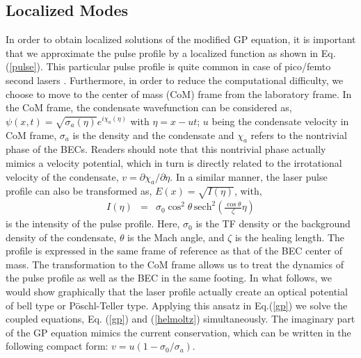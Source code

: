 \documentclass[epj]{svjour}
\begin{document}
\subsection{Localized Modes}

In order to obtain localized solutions of the modified GP equation, it is important that we approximate the pulse profile by a localized function as shown in Eq. (\ref{pulse}). This particular pulse profile is quite common in case of pico/femto second lasers \cite{joachain}. Furthermore, in order to reduce the computational difficulty, we choose to move to the center of mass (CoM) frame from the laboratory frame. In the CoM frame, the condensate wavefunction can be considered as, $\psi(x,t) = \sqrt{\sigma_{a}(\eta)} e^{i\chi_a(\eta)}$ with $\eta = x - u t$; $u$ being the condensate velocity in CoM frame, $\sigma_{a}$ is the density and the condensate and $\chi_{a}$ refers to the nontrivial phase of the BECs. Readers should note that this nontrivial phase actually mimics a velocity potential, which in turn is directly related to the irrotational velocity of the condensate, $v = \partial \chi_{a}/\partial \eta$. In a similar manner, the laser pulse profile can also be transformed as, $E(x) = \sqrt{I(\eta)}$, with,
\begin{eqnarray}
I(\eta) & = & \sigma_{0}\cos^{2}\theta\, \textrm{sech}^{2}\left(\frac{\cos\theta}{\zeta}\eta\right)\label{pulse}
\end{eqnarray}
is the intensity of the pulse profile. Here, $\sigma_0$ is the TF  density or the background density of the condensate, $\theta$ is the Mach angle, and $\zeta$ is the healing length. The profile is expressed in the same frame of reference as that of the BEC center of mass. The transformation to the CoM frame allows us to treat the dynamics of the pulse profile as well as the BEC in the same footing. In what follows, we would show graphically that the laser profile actually create an optical potential of bell type or P\"{o}schl-Teller type. Applying this ansatz in Eq.(\ref{gp}) we solve the coupled equations, Eq. (\ref{gp}) and (\ref{helmoltz}) simultaneously. The imaginary part of the GP equation mimics the current conservation, which can be written in the following compact form: $v = u (1-\sigma_0/\sigma_a)$.
\end{document}
